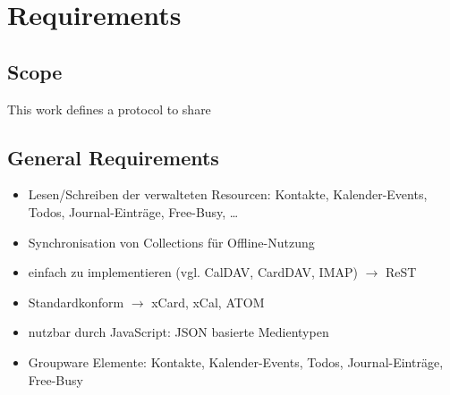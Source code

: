 \documentclass[12pt,a4paper]{scrartcl}		%
\begin{document}
\section{Requirements}


\subsection{Scope}

This work defines a protocol to share 


\subsection{General Requirements}

\begin{itemize}
  \item Lesen/Schreiben der verwalteten Resourcen: Kontakte, Kalender-Events, Todos, Journal-Einträge, Free-Busy, \ldots
  \item Synchronisation von Collections für Offline-Nutzung
  \item einfach zu implementieren (vgl. CalDAV, CardDAV, IMAP) $\rightarrow$ ReST
  \item Standardkonform $\rightarrow$ xCard, xCal, ATOM
  \item nutzbar durch JavaScript: JSON basierte Medientypen
  \item Groupware Elemente: Kontakte, Kalender-Events, Todos, Journal-Einträge, Free-Busy
\end{itemize}
\end{document}

